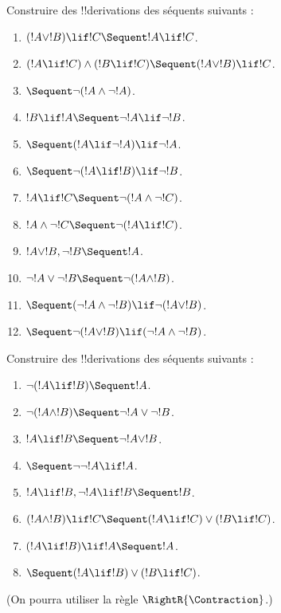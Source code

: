 \documentclass[../../../include/open-logic-section]{subfiles}
\begin{document}
\begin{prob}
Construire des !!{derivation}s des séquents suivants :
\begin{enumerate}
\item $(!A \lor !B) \lif !C \Sequent !A \lif !C$.
\item $(!A \lif !C) \land (!B \lif !C) \Sequent (!A \lor !B) \lif !C$.
\item $\Sequent \lnot(!A \land \lnot !A)$.
\item $!B \lif !A \Sequent \lnot !A \lif \lnot !B$.
\item $\Sequent (!A \lif \lnot !A) \lif \lnot !A$.
\item $\Sequent \lnot(!A \lif !B) \lif \lnot !B$.
\item $!A \lif !C \Sequent \lnot (!A \land \lnot !C)$.
\item $!A \land \lnot !C \Sequent \lnot (!A \lif !C)$.
\item $!A \lor !B, \lnot !B \Sequent !A$.
\item $\lnot !A \lor \lnot !B \Sequent \lnot(!A \land !B)$.
\item $\Sequent (\lnot !A \land \lnot !B) \lif\lnot(!A \lor !B)$.
\item $\Sequent \lnot(!A \lor !B) \lif (\lnot !A \land \lnot !B)$.
\end{enumerate}
\end{prob}

\begin{prob}
Construire des !!{derivation}s des séquents suivants :
\begin{enumerate}
\item $\lnot(!A \lif !B) \Sequent !A$.
\item $\lnot(!A \land !B) \Sequent \lnot !A \lor \lnot !B$.
\item $!A \lif !B \Sequent \lnot !A \lor !B$.
\item $\Sequent \lnot \lnot !A \lif !A$.
\item $!A \lif !B, \lnot !A \lif !B \Sequent !B$.
\item $(!A \land !B) \lif !C \Sequent (!A \lif !C) \lor (!B \lif !C)$.
\item $(!A \lif !B) \lif !A \Sequent !A$.
\item $\Sequent (!A \lif !B) \lor (!B \lif !C)$.
\end{enumerate}
(On pourra utiliser la règle $\RightR{\Contraction}$.)
\end{prob}
\end{document}
